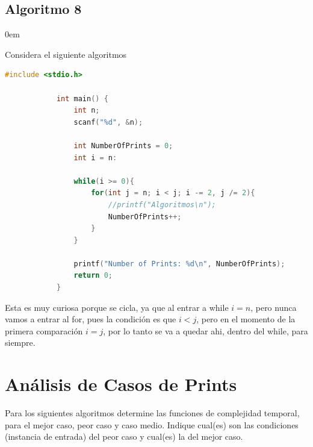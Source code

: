 \documentclass[12pt, fleqn]{article}                            %
\newenvironment{SmallIndentation}[1][0.75em]                    %
        {\begin{adjustwidth}{#1}{}\begin{footnotesize}}             %
        {\end{footnotesize}\end{adjustwidth}}                       %
\theoremstyle{break}                                            %
\begin{document}
    \clearpage
    \subsection{Algoritmo 8}
    \begin{SmallIndentation}[0em]

        Considera el siguiente algoritmos
        \begin{lstlisting}[language=C, gobble=12, basicstyle=\small\color{white}]
            #include <stdio.h>

            int main() {
                int n;
                scanf("%d", &n);

                int NumberOfPrints = 0;
                int i = n:

                while(i >= 0){
                    for(int j = n; i < j; i -= 2, j /= 2){
                        //printf("Algoritmos\n");
                        NumberOfPrints++;
                    }
                }

                printf("Number of Prints: %d\n", NumberOfPrints);
                return 0;
            }
        \end{lstlisting}


        Esta es muy curiosa porque se cicla, ya que al entrar a while $i = n$, 
        pero nunca vamos a entrar al for, pues la condición es que $i < j$, pero
        en el momento de la primera comparación $ i = j$, por lo tanto
        se va a quedar ahi, dentro del while, para siempre.
    \end{SmallIndentation}
            







\clearpage
\section{Análisis de Casos de Prints}

    Para los siguientes algoritmos determine las funciones de complejidad
    temporal, para el mejor caso, peor caso y caso medio. Indique cual(es)
    son las condiciones (instancia de entrada) del peor caso y cual(es) la del
    mejor caso.
\end{document}
